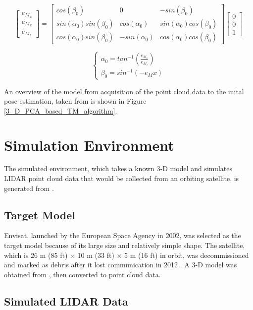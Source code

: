 \documentclass[conference]{IEEEtran}
\begin{document}
		\begin{equation}
			\label{eqn:estimated_axes}
			\begin{bmatrix} e_{M_x} \\ e_{M_y} \\ e_{M_z} \end{bmatrix}
			=
			\begin{bmatrix}
				cos(\beta_0)  & 0 & -sin(\beta_0) \\
				sin(\alpha_0)sin(\beta_0) & cos(\alpha_0) & sin(\alpha_0)cos(\beta_0) \\
				cos(\alpha_0)sin(\beta_0) & -sin(\alpha_0) & cos(\alpha_0)cos(\beta_0)
			\end{bmatrix}
			\begin{bmatrix} 0 \\ 0 \\ 1 \end{bmatrix}
		\end{equation}
		
		\begin{equation}
			\label{eqn:estimated_roll_pitch}
			\begin{cases}
				\alpha_0 = tan^{-1}(\frac{e_{M_x}}{e_{M_z}}) \\
				\beta_0 = sin^{-1}(-e_Mx)
			\end{cases} 
		\end{equation}
		
		
		An overview of the model from acquisition of the point cloud data to the inital pose estimation, taken from \cite{2017_pose_pca} is shown in Figure \ref{3_D_PCA_based_TM_algorithm}.

	\section{Simulation Environment}
		The simulated environment, which takes a known 3-D model and simulates LIDAR point cloud data that would be collected from an orbiting satellite, is generated from \cite{liu2016point}.
		
	\subsection{Target Model}
		Envisat, launched by the European Space Agency in 2002, was selected as the target model because of its large size and relatively simple shape. The satellite, which is 26 m (85 ft) × 10 m (33 ft) × 5 m (16 ft) in orbit, was decommissioned and marked as debris after it lost communication in 2012 \cite{envisat_overview}. A 3-D model was obtained from \cite{envisat_3d_model}, then converted to point cloud data.
		
		
	
	\subsection{Simulated LIDAR Data}
		
		
	\nocite{*}
	\printbibliography
	
\end{document}
